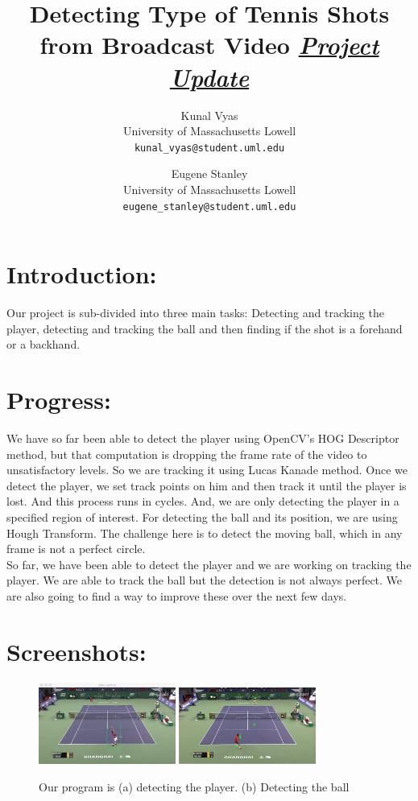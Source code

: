 \documentclass[11pt]{article}
\begin{document}
\title{\textbf{Detecting Type of Tennis Shots from Broadcast Video \underline{\emph{Project Update}}}}
\author{Kunal Vyas\\
    University of Massachusetts Lowell\\
  \texttt{kunal\_vyas@student.uml.edu}
  \and
  Eugene Stanley\\
  University of Massachusetts Lowell\\
  \texttt{eugene\_stanley@student.uml.edu}}
  \date{\vspace{-1ex}}
  \maketitle
  
  \section{Introduction:}
  Our project is sub-divided into three main tasks: Detecting and tracking the player, detecting and tracking the ball and then finding if the shot is a forehand or a backhand.
  \section{Progress:}
  We have so far been able to detect the player using OpenCV's HOG Descriptor method, but that computation is dropping the frame rate of the video to unsatisfactory levels. So we are tracking it using Lucas Kanade method. Once we detect the player, we set track points on him and then track it until the player is lost. And this process runs in cycles. And, we are only detecting the player in a specified region of interest. For detecting the ball and its position, we are using Hough Transform. The challenge here is to detect the moving ball, which in any frame is not a perfect circle.\\
  So far, we have been able to detect the player and we are working on tracking the player. We are able to track the ball but the detection is not always perfect. We are also going to find a way to improve these over the next few days.
  \section{Screenshots:}
  \begin{figure}[h]
  \centering
  \includegraphics[width=0.4\textwidth]{1.png}
  \includegraphics[width=0.4\textwidth]{3.png}
  \caption{Our program is (a) detecting the player. (b) Detecting the ball}
  \end{figure}
  
\end{document}
